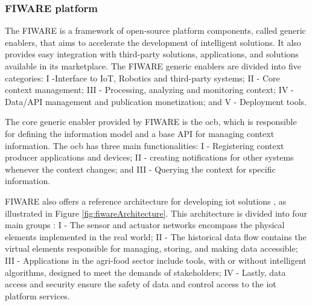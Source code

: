 \documentclass[preprint, review, 12pt]{elsarticle}
\begin{document}


\subsubsection{FIWARE platform}

The FIWARE \cite{FIWARE2021} is a framework of open-source platform components, called generic enablers, that aims to accelerate the development of intelligent solutions. It also provides easy integration with third-party solutions, applications, and solutions available in its marketplace. The FIWARE generic enablers are divided into five categories: I -Interface to IoT, Robotics and third-party systems; II - Core context management; III - Processing, analyzing and monitoring context; IV - Data/API management and publication monetization; and V - Deployment tools. 

The core generic enabler provided by FIWARE is the \gls{ocb}, which is responsible for defining the information model and a base API for managing context information. The \gls{ocb} has three main functionalities: I - Registering context producer applications and devices; II - creating notifications for other systems whenever the context changes; and III - Querying the context for specific information. 

FIWARE also offers a reference architecture for developing \gls{iot} solutions \cite{FIWARE2018}, as illustrated in Figure \ref{fig:fiwareArchitecture}. This architecture is divided into four main groups \cite{FIWARE2021}: I - The sensor and actuator networks encompass the physical elements implemented in the real world; II - The historical data flow contains the virtual elements responsible for managing, storing, and making data accessible; III - Applications in the agri-food sector include tools, with or without intelligent algorithms, designed to meet the demands of stakeholders; IV - Lastly, data access and security ensure the safety of data and control access to the \gls{iot} platform services.
\end{document}
